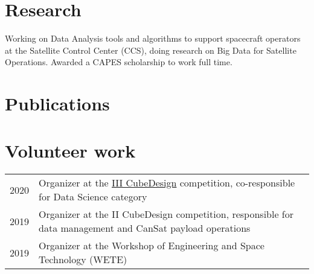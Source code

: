 \documentclass[]{deedy-resume-openfont}
\begin{document}
\begin{minipage}[t]{0.66\textwidth}

\section{Research}
Working on Data Analysis tools and algorithms to support spacecraft operators at the Satellite Control Center (CCS), doing research on Big Data for Satellite Operations.
Awarded a CAPES scholarship to work full time.
\sectionsep


\section{Publications}
\vspace{15pt}
\renewcommand\refname{\vskip -1.5cm} %


\nocite{*}


\section{Volunteer work}
\begin{tabular}{cp{10cm}}
2020 & Organizer at the \href{http://www.inpe.br/cubedesign/2020/}{III CubeDesign} competition, co-responsible for Data Science category\\
2019 & Organizer at the II CubeDesign competition, responsible for data management and CanSat payload operations\\
2019 & Organizer at the Workshop of Engineering and Space Technology (WETE) \\
\end{tabular}

\end{minipage}
\end{document}
